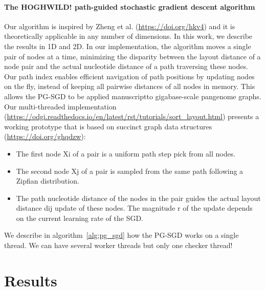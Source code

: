 \documentclass{bioinfo}
\theoremstyle{definition}
\begin{document}
\paragraph{The HOGHWILD! path-guided stochastic gradient descent algorithm}
Our algorithm is inspired by Zheng et al. (\url{https://doi.org/hkv4}) and it is theoretically applicable in any number of dimensions.
In this work, we describe the results in 1D and 2D.
In our implementation, the algorithm moves a single pair of nodes at a time, minimizing the disparity between the layout distance of a node pair and the actual nucleotide distance of a path traversing these nodes.
Our path index enables efficient navigation of path positions by updating nodes on the fly, instead of keeping all pairwise distances of all nodes in memory.
This allows the PG-SGD to be applied manuscriptto gigabase-scale pangenome graphs. \\
Our multi-threaded implementation (\url{https://odgi.readthedocs.io/en/latest/rst/tutorials/sort_layout.html}) presents a working prototype that is based on succinct graph data structures (\url{https://doi.org/ghqdzw}):
\begin{itemize}
	\item The first node Xi of a pair is a uniform path step pick from all nodes.
	\item The second node Xj of a pair is sampled from the same path following a Zipfian distribution. 
	\item The path nucleotide distance of the nodes in the pair guides the actual layout distance dij update of these nodes. The magnitude r of the update depends on the current learning rate of the SGD.
\end{itemize}
We describe in algorithm~\ref{alg:pg_sgd} how the PG-SGD works on a single thread. We can have several worker threads but only one checker thread!



\iffalse
Fig. 1: Describe how our approach works, especially a single update operation (Fig. \ref{fig:sketches}). Explanation of 1D graph updating in Figures \ref{fig:1d_before_update}-\ref{fig:1d_after_update}. Explanation of 2D graph updating in Figures \ref{fig:2d_before_update}-\ref{fig:2d_after_update}. Zipfian distribution.


\fi

\iffalse
\section{Results}
\label{sec:results}
\end{document}
